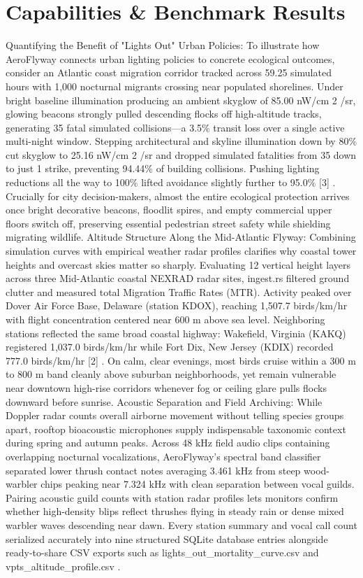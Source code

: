 \documentclass[10pt,letterpaper]{article}
\begin{document}
\section{Capabilities \& Benchmark Results}
Quantifying the Benefit of "Lights Out" Urban Policies: To illustrate how AeroFlyway connects urban lighting policies to concrete ecological outcomes, consider an Atlantic coast migration corridor tracked across 59.25 simulated hours with 1,000 nocturnal migrants crossing near populated shorelines. Under bright baseline illumination producing an ambient skyglow of 85.00 nW/cm 2 /sr, glowing beacons strongly pulled descending flocks off high-altitude tracks, generating 35 fatal simulated collisions---a 3.5\% transit loss over a single active multi-night window. Stepping architectural and skyline illumination down by 80\% cut skyglow to 25.16 nW/cm 2 /sr and dropped simulated fatalities from 35 down to just 1 strike, preventing 94.44\% of building collisions. Pushing lighting reductions all the way to 100\% lifted avoidance slightly further to 95.0\% [3] . Crucially for city decision-makers, almost the entire ecological protection arrives once bright decorative beacons, floodlit spires, and empty commercial upper floors switch off, preserving essential pedestrian street safety while shielding migrating wildlife. Altitude Structure Along the Mid-Atlantic Flyway: Combining simulation curves with empirical weather radar profiles clarifies why coastal tower heights and overcast skies matter so sharply. Evaluating 12 vertical height layers across three Mid-Atlantic coastal NEXRAD radar sites, ingest.rs filtered ground clutter and measured total Migration Traffic Rates (MTR). Activity peaked over Dover Air Force Base, Delaware (station KDOX), reaching 1,507.7 birds/km/hr with flight concentration centered near 600 m above sea level. Neighboring stations reflected the same broad coastal highway: Wakefield, Virginia (KAKQ) registered 1,037.0 birds/km/hr while Fort Dix, New Jersey (KDIX) recorded 777.0 birds/km/hr [2] . On calm, clear evenings, most birds cruise within a 300 m to 800 m band cleanly above suburban neighborhoods, yet remain vulnerable near downtown high-rise corridors whenever fog or ceiling glare pulls flocks downward before sunrise. Acoustic Separation and Field Archiving: While Doppler radar counts overall airborne movement without telling species groups apart, rooftop bioacoustic microphones supply indispensable taxonomic context during spring and autumn peaks. Across 48 kHz field audio clips containing overlapping nocturnal vocalizations, AeroFlyway's spectral band classifier separated lower thrush contact notes averaging 3.461 kHz from steep wood-warbler chips peaking near 7.324 kHz with clean separation between vocal guilds. Pairing acoustic guild counts with station radar profiles lets monitors confirm whether high-density blips reflect thrushes flying in steady rain or dense mixed warbler waves descending near dawn. Every station summary and vocal call count serialized accurately into nine structured SQLite database entries alongside ready-to-share CSV exports such as lights\_out\_mortality\_curve.csv and vpts\_altitude\_profile.csv .
\end{document}
